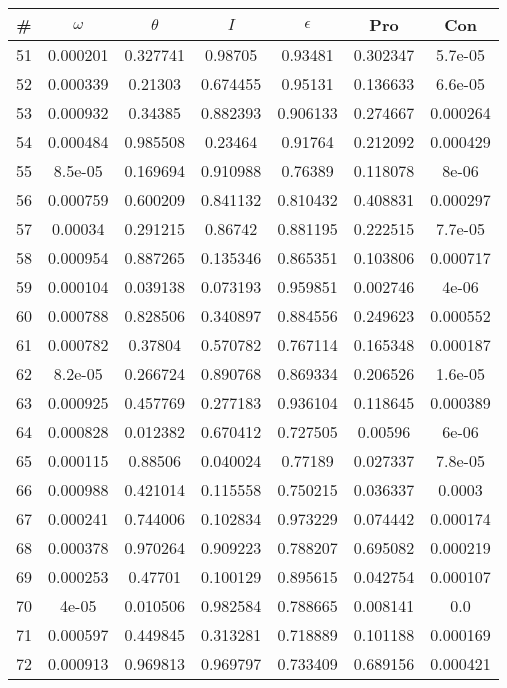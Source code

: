 \newpage
\begin{table}
\begin{tabular}{c|c|c|c|c|c|c}
\# & $\omega$ & $\theta$ & $I$ & $\epsilon$ & Pro & Con\\
\hline
51 & 0.000201 & 0.327741 & 0.98705 & 0.93481 & 0.302347 & 5.7e-05\\
52 & 0.000339 & 0.21303 & 0.674455 & 0.95131 & 0.136633 & 6.6e-05\\
53 & 0.000932 & 0.34385 & 0.882393 & 0.906133 & 0.274667 & 0.000264\\
54 & 0.000484 & 0.985508 & 0.23464 & 0.91764 & 0.212092 & 0.000429\\
55 & 8.5e-05 & 0.169694 & 0.910988 & 0.76389 & 0.118078 & 8e-06\\
56 & 0.000759 & 0.600209 & 0.841132 & 0.810432 & 0.408831 & 0.000297\\
57 & 0.00034 & 0.291215 & 0.86742 & 0.881195 & 0.222515 & 7.7e-05\\
58 & 0.000954 & 0.887265 & 0.135346 & 0.865351 & 0.103806 & 0.000717\\
59 & 0.000104 & 0.039138 & 0.073193 & 0.959851 & 0.002746 & 4e-06\\
60 & 0.000788 & 0.828506 & 0.340897 & 0.884556 & 0.249623 & 0.000552\\
61 & 0.000782 & 0.37804 & 0.570782 & 0.767114 & 0.165348 & 0.000187\\
62 & 8.2e-05 & 0.266724 & 0.890768 & 0.869334 & 0.206526 & 1.6e-05\\
63 & 0.000925 & 0.457769 & 0.277183 & 0.936104 & 0.118645 & 0.000389\\
64 & 0.000828 & 0.012382 & 0.670412 & 0.727505 & 0.00596 & 6e-06\\
65 & 0.000115 & 0.88506 & 0.040024 & 0.77189 & 0.027337 & 7.8e-05\\
66 & 0.000988 & 0.421014 & 0.115558 & 0.750215 & 0.036337 & 0.0003\\
67 & 0.000241 & 0.744006 & 0.102834 & 0.973229 & 0.074442 & 0.000174\\
68 & 0.000378 & 0.970264 & 0.909223 & 0.788207 & 0.695082 & 0.000219\\
69 & 0.000253 & 0.47701 & 0.100129 & 0.895615 & 0.042754 & 0.000107\\
70 & 4e-05 & 0.010506 & 0.982584 & 0.788665 & 0.008141 & 0.0\\
71 & 0.000597 & 0.449845 & 0.313281 & 0.718889 & 0.101188 & 0.000169\\
72 & 0.000913 & 0.969813 & 0.969797 & 0.733409 & 0.689156 & 0.000421\\

\end{tabular}
\end{table}
